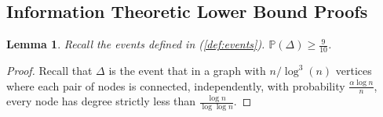 \documentclass[english]{article}
\newtheorem{lemma}{Lemma}
\newcommand{\1}{\textbf{1}}
\newcommand{\p}{\mathbb{P}}
\begin{document}
\subsection{Information Theoretic Lower Bound Proofs}



\begin{lemma}\label{lemma:delta910}
Recall the events defined in (\ref{def:events}). $\p\left( \Delta\right) \geq \frac9{10}$.
\end{lemma}

\begin{proof}
Recall that $\Delta$ is the event that in a graph with $n/\log^3(n)$ vertices where each pair of nodes is connected, independently, with probability $\frac{\alpha\log n}{n}$, every node has degree strictly less than $\frac{\log n}{\log \log n}$. 


\end{proof}
\end{document}
